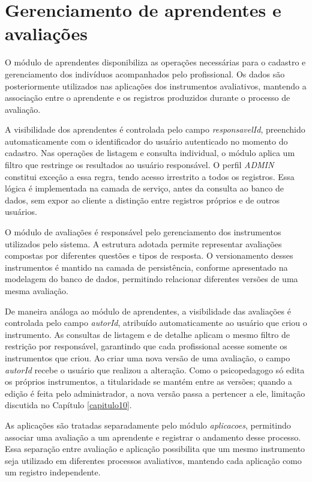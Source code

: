 \section{Gerenciamento de aprendentes e avaliações}

O módulo de aprendentes disponibiliza as operações necessárias para o cadastro e gerenciamento dos indivíduos acompanhados pelo profissional. Os dados são posteriormente utilizados nas aplicações dos instrumentos avaliativos, mantendo a associação entre o aprendente e os registros produzidos durante o processo de avaliação.

A visibilidade dos aprendentes é controlada pelo campo \textit{responsavelId}, preenchido automaticamente com o identificador do usuário autenticado no momento do cadastro. Nas operações de listagem e consulta individual, o módulo aplica um filtro que restringe os resultados ao usuário responsável. O perfil \textit{ADMIN} constitui exceção a essa regra, tendo acesso irrestrito a todos os registros. Essa lógica é implementada na camada de serviço, antes da consulta ao banco de dados, sem expor ao cliente a distinção entre registros próprios e de outros usuários.

O módulo de avaliações é responsável pelo gerenciamento dos instrumentos utilizados pelo sistema. A estrutura adotada permite representar avaliações compostas por diferentes questões e tipos de resposta. O versionamento desses instrumentos é mantido na camada de persistência, conforme apresentado na modelagem do banco de dados, permitindo relacionar diferentes versões de uma mesma avaliação.

De maneira análoga ao módulo de aprendentes, a visibilidade das avaliações é controlada pelo campo \textit{autorId}, atribuído automaticamente ao usuário que criou o instrumento. As consultas de listagem e de detalhe aplicam o mesmo filtro de restrição por responsável, garantindo que cada profissional acesse somente os instrumentos que criou. Ao criar uma nova versão de uma avaliação, o campo \textit{autorId} recebe o usuário que realizou a alteração. Como o psicopedagogo só edita os próprios instrumentos, a titularidade se mantém entre as versões; quando a edição é feita pelo administrador, a nova versão passa a pertencer a ele, limitação discutida no Capítulo \ref{capitulo10}.

As aplicações são tratadas separadamente pelo módulo \textit{aplicacoes}, permitindo associar uma avaliação a um aprendente e registrar o andamento desse processo. Essa separação entre avaliação e aplicação possibilita que um mesmo instrumento seja utilizado em diferentes processos avaliativos, mantendo cada aplicação como um registro independente.

